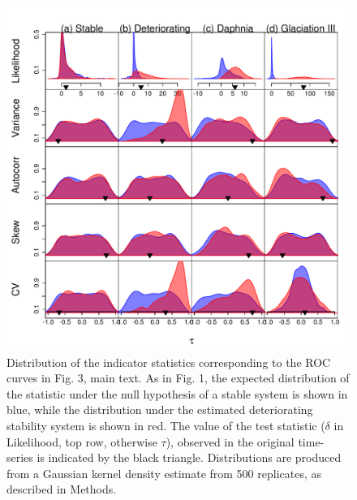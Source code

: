 \documentclass[11pt]{elsarticle}
\begin{document}
\begin{figure}[ht]
  \begin{center}
    \includegraphics{FigS1.pdf}
  \end{center}
  \caption{Distribution of the indicator statistics corresponding to the ROC curves in Fig. 3, main text. As in Fig. 1, the expected distribution of the statistic under the null hypothesis of a stable system is shown in blue, while the distribution under the estimated deteriorating stability system is shown in red.  The value of the test statistic ($\delta$ in Likelihood, top row, otherwise $\tau$), observed in the original time-series is indicated by the black triangle. Distributions are produced from a Gaussian kernel density estimate from 500 replicates, as described in Methods.}
  \label{fig:S1}
\end{figure}
\end{document}
